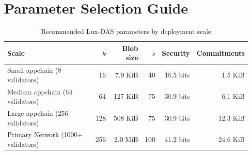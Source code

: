\section{Parameter Selection Guide}

\label{app:parameters}

\begin{table}[H]
\centering
\caption{Recommended Lux-DAS parameters by deployment scale}
\label{tab:params}
\begin{tabular}{lrrrrr}
\toprule
\textbf{Scale} & \textbf{$k$} & \textbf{Blob size} & \textbf{$s$} & \textbf{Security} & \textbf{Commitments} \\
\midrule
Small appchain (8 validators) & 16 & 7.9 KiB & 40 & 16.5 bits & 1.5 KiB \\
Medium appchain (64 validators) & 64 & 127 KiB & 75 & 30.9 bits & 6.1 KiB \\
Large appchain (256 validators) & 128 & 508 KiB & 75 & 30.9 bits & 12.3 KiB \\
Primary Network (1000+ validators) & 256 & 2.0 MiB & 100 & 41.2 bits & 24.6 KiB \\
\bottomrule
\end{tabular}
\end{table}

